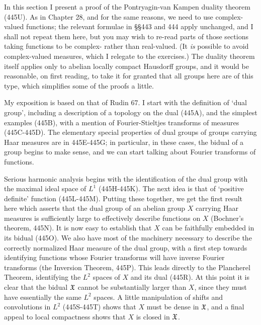 
\def\varhatbarf{{\setover{\,\,\lower 0.4ex
              \hbox{$\scriptscriptstyle\wedge$}}{\bar f}}}

\def\chaptername{Topological groups}
\def\sectionname{The duality theorem}


In this section I present a proof of the Pontryagin-van Kampen duality
theorem (445U).   As in Chapter 28, and for the same reasons, we need to
use complex-valued functions;  the relevant formulae in \S\S443 and 444
apply
unchanged, and I shall not repeat them here, but you may wish to re-read
parts of those sections taking functions to be complex- rather than
real-valued.   (It {\it is} possible to avoid complex-valued measures,
which I relegate to the exercises.)
The duality theorem itself applies only to abelian locally compact
Hausdorff groups, and it would be reasonable, on first reading, to take
it for granted that all groups here are of this type, which simplifies
some of the proofs a little.

My exposition is based on that of {\smc Rudin 67}.   I start with the
definition of `dual group', including a description of a topology on the
dual (445A), and the simplest examples (445B), with a mention of
Fourier-Stieltjes transforms of measures (445C-445D).   The elementary
special properties of dual groups of groups carrying Haar measures are
in 445E-445G;  in particular, in these cases, the bidual of a group
begins to make sense, and we can start talking about Fourier transforms
of functions.

Serious harmonic analysis begins with the identification of the dual
group with the maximal ideal space of $L^1$ (445H-445K).   The next idea
is that of `positive definite' function (445L-445M).   Putting these
together, we get the first result here which asserts that the
dual group of an abelian group $X$ carrying Haar measures is
sufficiently large to effectively describe functions on $X$ (Bochner's
theorem, 445N).   It is now easy to establish that $X$ can be faithfully
embedded in its bidual (445O).   We also have most of the machinery
necessary to describe the correctly normalized Haar measure of the dual
group, with a first step towards identifying functions whose Fourier
transforms will have inverse Fourier transforms (the Inversion Theorem,
445P).   This leads directly to the Plancherel Theorem, identifying the
$L^2$ spaces of $X$ and its dual (445R).   At this point it is clear
that the bidual $\frak X$ cannot be substantially larger than $X$, since
they must have essentially the same $L^2$ spaces.   A little
manipulation of
shifts and convolutions in $L^2$ (445S-445T) shows that $X$ must be
dense in $\frak X$, and a final appeal to local compactness
shows that $X$ is closed in $\frak X$.

